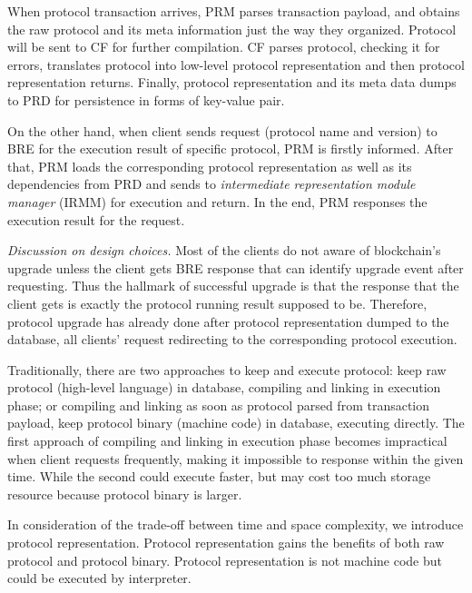\documentclass[sigplan,screen]{acmart}
\begin{document}
When protocol transaction arrives, PRM parses transaction payload, and
obtains the raw protocol and its meta information just the way they organized.
Protocol will be sent to CF for further compilation. CF parses protocol,
checking it for errors, translates protocol
into low-level protocol representation and then protocol representation returns.
Finally, protocol representation and its meta data dumps to PRD for persistence
in forms of key-value pair.

On the other hand, when client sends request (protocol name and version)
to BRE for the execution result of specific protocol, PRM is firstly informed.
After that, PRM loads the corresponding protocol representation as well as its
dependencies from PRD and sends to \textit{intermediate representation module
  manager }(IRMM) for execution and return.
In the end, PRM responses the execution result for the request.

\textit{Discussion on design choices.}
Most of the clients do not aware of blockchain's upgrade unless the client
gets BRE response that can identify upgrade event after requesting. Thus the
hallmark of successful upgrade is that the response that the client gets is
exactly the protocol running result supposed to be.
Therefore, protocol upgrade has already done after protocol representation
dumped to the database, all clients' request redirecting to the corresponding
protocol execution.

Traditionally, there are two approaches to keep and execute protocol: keep raw
protocol (high-level language) in database, compiling and linking in execution
phase; or compiling and linking as soon as protocol parsed from transaction
payload, keep protocol binary (machine code) in database, executing directly.
The first approach of compiling and linking in execution phase becomes
impractical when client requests frequently, making it impossible to response
within the given time. While the second could execute faster, but may cost too
much storage resource because protocol binary is larger.

In consideration of the trade-off between time and space complexity, we
introduce protocol representation. Protocol representation gains the benefits
of both raw protocol and protocol binary. Protocol representation is not
machine code but could be executed by interpreter.
\end{document}
